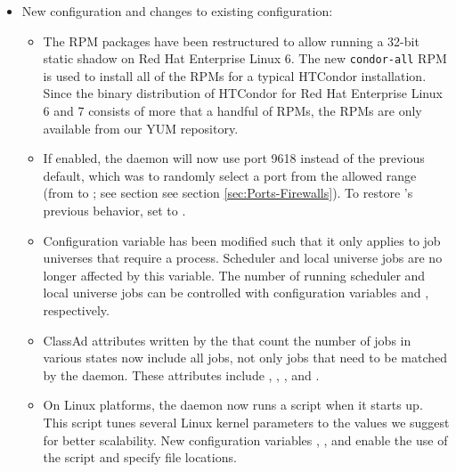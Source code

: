 \begin{itemize}

\item New configuration and changes to existing configuration:
  \begin{itemize}

\item The RPM packages have been restructured to allow running a 32-bit
static shadow on Red Hat Enterprise Linux 6. The new \texttt{condor-all}
RPM is used to install all of the RPMs for a typical HTCondor installation.
Since the binary distribution of HTCondor for Red Hat Enterprise Linux 6 and 7
consists of more that a handful of RPMs, the RPMs are only available from our
YUM repository.

\item If enabled, the  daemon will now use port 9618
instead of the previous default, which was to randomly select a port from
the allowed range (from  to ; see section
see section \ref{sec:Ports-Firewalls}).  To restore 's
previous behavior, set  to .

\item Configuration variable  has been
modified such that it only applies to job universes that require a
 process.
Scheduler and local universe jobs are no longer affected by this
variable.
The number of running scheduler and local universe jobs can be controlled
with configuration variables  and
, respectively.

\item ClassAd attributes written by the  that
count the number of jobs in various states now include all jobs,
not only jobs that need to be matched by the  daemon.
These attributes include , ,
, and .

\item On Linux platforms, the  daemon now runs a script when it
starts up.
This script tunes several Linux kernel parameters to the values
we suggest for better scalability.
New configuration variables ,
, and 
enable the use of the script and specify file locations.


\end{itemize}
\end{itemize}
